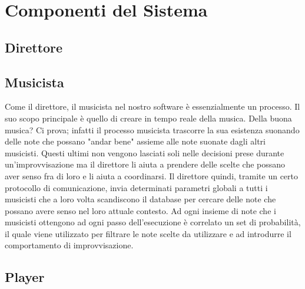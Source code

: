 \section{Componenti del Sistema}
\subsection{Direttore}

\subsection{Musicista}
Come il direttore, il musicista nel nostro software è essenzialmente un processo. Il suo scopo principale è quello di creare in tempo reale della musica. Della buona musica? Ci prova; infatti il processo musicista trascorre la sua esistenza suonando delle note che possano "andar bene" assieme alle note suonate dagli altri musicisti. Questi ultimi non vengono lasciati soli nelle decisioni prese durante un'improvvisazione ma il direttore li aiuta a prendere delle scelte che possano aver senso fra di loro e li aiuta a coordinarsi. Il direttore quindi, tramite un certo protocollo di comunicazione, invia determinati parametri globali a tutti i musicisti che a loro volta scandiscono il database per cercare delle note che possano avere senso nel loro attuale contesto. Ad ogni insieme di note che i musicisti ottengono ad ogni passo dell'esecuzione è correlato un set di probabilità, il quale viene utilizzato per filtrare le note scelte da utilizzare e ad introdurre il comportamento di improvvisazione.

\subsection{Player}
